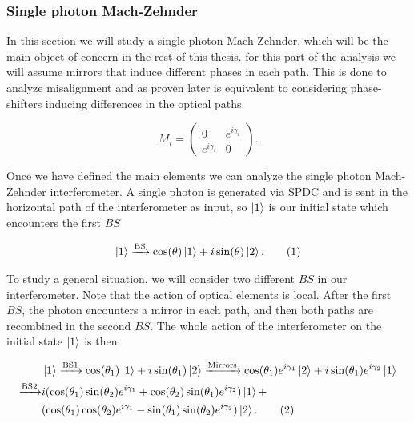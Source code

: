 \documentclass[12pt]{article}
\begin{document}
\newcommand\numberthis{\addtocounter{equation}{1}\tag{\theequation}}

\subsubsection{Single photon Mach-Zehnder}

In this section we will study a single photon Mach-Zehnder, which will be the main object of concern in the rest of this thesis. for this part of the analysis we will assume mirrors that induce different phases in each path. This is done to analyze misalignment and as proven later is equivalent to considering phase-shifters inducing differences in the optical paths.

\begin{equation}
M_{i}= \begin{pmatrix} 0& e^{i\gamma_{i}} \\ e^{i\gamma_{i}} & 0 \end{pmatrix}.
\end{equation}

Once we have defined the main elements we can analyze the single photon Mach-Zehnder interferometer. A single photon is generated via SPDC and is sent in the horizontal path of the interferometer as input, so $\ket{1}$ is our initial state which encounters the first $BS$

\begin{align}
\ket{1}\xrightarrow{\text{BS}}\cos(\theta)\ket{1}+i\sin(\theta)\ket{2}.
\numberthis
\end{align}

To study a general situation, we will consider two different $BS$ in our interferometer. Note that the action of optical elements is local. After the first $BS$, the photon encounters a mirror in each path, and then both paths are recombined in the second $BS$. The whole action of the interferometer on the initial state $\ket{1}$ is then:


\begin{align*}
&\ket{1}\xrightarrow{\text{BS1}}\cos(\theta_{1})\ket{1}+i\sin(\theta_{1})\ket{2}\xrightarrow{\text{Mirrors}}\cos(\theta_{1})e^{i\gamma_{1}}\ket{2}+i\sin(\theta_{1})e^{i\gamma_{2}}\ket{1} \\ \xrightarrow{\text{BS2}} 
 &i(\cos(\theta_{1})\sin(\theta_{2})e^{i\gamma_{1}}+\cos(\theta_{2})\sin(\theta_{1})e^{i\gamma_{2}})\ket{1}+\\&(\cos(\theta_{1})\cos(\theta_{2})e^{i\gamma_{1}}-\sin(\theta_{1})\sin(\theta_{2})e^{i\gamma_{2}})\ket{2}. \numberthis
\end{align*}
\end{document}
